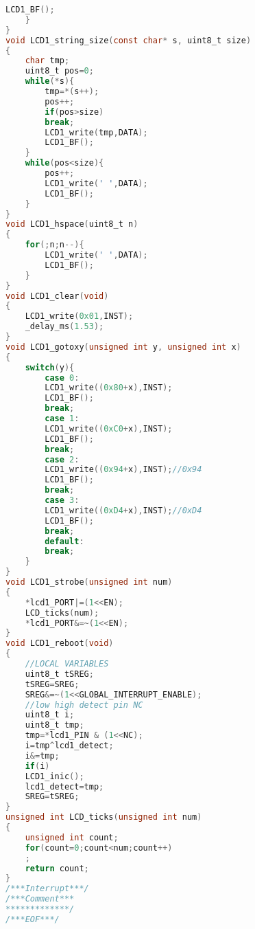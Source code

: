 \begin{lstlisting}[language=C]
		LCD1_BF();
	}
}
void LCD1_string_size(const char* s, uint8_t size)
{
	char tmp;
	uint8_t pos=0;
	while(*s){
		tmp=*(s++);
		pos++;
		if(pos>size)
		break;
		LCD1_write(tmp,DATA);
		LCD1_BF();
	}
	while(pos<size){
		pos++;
		LCD1_write(' ',DATA);
		LCD1_BF();
	}
}
void LCD1_hspace(uint8_t n)
{
	for(;n;n--){
		LCD1_write(' ',DATA);
		LCD1_BF();
	}
}
void LCD1_clear(void)
{
	LCD1_write(0x01,INST);
	_delay_ms(1.53);
}
void LCD1_gotoxy(unsigned int y, unsigned int x)
{
	switch(y){
		case 0:
		LCD1_write((0x80+x),INST);
		LCD1_BF();
		break;
		case 1:
		LCD1_write((0xC0+x),INST);
		LCD1_BF();
		break;
		case 2:
		LCD1_write((0x94+x),INST);//0x94
		LCD1_BF();
		break;
		case 3:
		LCD1_write((0xD4+x),INST);//0xD4
		LCD1_BF();
		break;
		default:
		break;
	}
}
void LCD1_strobe(unsigned int num)
{
	*lcd1_PORT|=(1<<EN);
	LCD_ticks(num);
	*lcd1_PORT&=~(1<<EN);
}
void LCD1_reboot(void)
{
	//LOCAL VARIABLES
	uint8_t tSREG;
	tSREG=SREG;
	SREG&=~(1<<GLOBAL_INTERRUPT_ENABLE);
	//low high detect pin NC
	uint8_t i;
	uint8_t tmp;
	tmp=*lcd1_PIN & (1<<NC);
	i=tmp^lcd1_detect;
	i&=tmp;
	if(i)
	LCD1_inic();
	lcd1_detect=tmp;
	SREG=tSREG;
}
unsigned int LCD_ticks(unsigned int num)
{
	unsigned int count;
	for(count=0;count<num;count++)
	;
	return count;
}
/***Interrupt***/
/***Comment***
*************/
/***EOF***/
\end{lstlisting}
